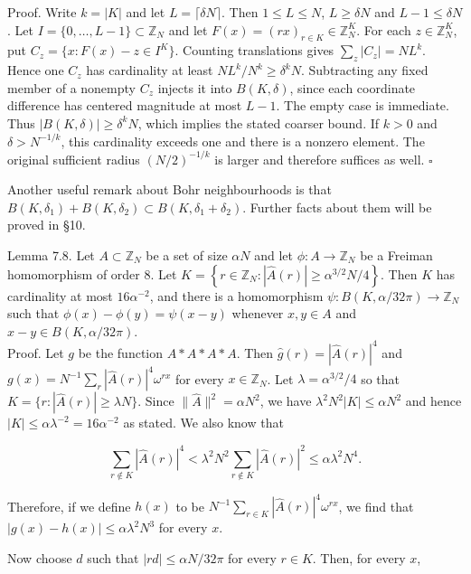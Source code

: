 \documentclass[10pt]{article}
\begin{document}
Proof. Write $k=|K|$ and let $L=\lceil\delta N\rceil$. Then
$1\leqslant L\leqslant N$, $L\geqslant\delta N$ and $L-1\leqslant\delta N$.
Let $I=\{0,\ldots,L-1\}\subset\mathbb Z_N$ and let
$F(x)=(rx)_{r\in K}\in\mathbb Z_N^K$. For each $z\in\mathbb Z_N^K$, put
$C_z=\{x:F(x)-z\in I^K\}$. Counting translations gives
$\sum_z|C_z|=NL^k$. Hence one $C_z$ has cardinality at least
$NL^k/N^k\geqslant\delta^kN$. Subtracting any fixed member of a nonempty
$C_z$ injects it into $B(K,\delta)$, since each coordinate difference has
centered magnitude at most $L-1$. The empty case is immediate. Thus
$|B(K,\delta)|\geqslant\delta^kN$, which implies the stated coarser bound.
If $k>0$ and $\delta>N^{-1/k}$, this cardinality exceeds one and there
is a nonzero element. The original sufficient radius
$(N/2)^{-1/k}$ is larger and therefore suffices as well. \(\square\)

Another useful remark about Bohr neighbourhoods is that $B\left(K, \delta_{1}\right)+B\left(K, \delta_{2}\right) \subset B\left(K, \delta_{1}+\delta_{2}\right)$. Further facts about them will be proved in §10.

Lemma 7.8. Let $A \subset \mathbb{Z}_{N}$ be a set of size $\alpha N$ and let $\phi: A \rightarrow \mathbb{Z}_{N}$ be a Freiman homomorphism of order 8. Let $K=\left\{r \in \mathbb{Z}_{N}:|\hat{A}(r)| \geqslant \alpha^{3 / 2} N / 4\right\}$. Then $K$ has cardinality at most $16 \alpha^{-2}$, and there is a homomorphism $\psi: B(K, \alpha / 32 \pi) \rightarrow \mathbb{Z}_{N}$ such that $\phi(x)-\phi(y)=\psi(x-y)$ whenever $x, y \in A$ and $x-y \in B(K, \alpha / 32 \pi)$.\\
Proof. Let $g$ be the function $A * A * A * A$. Then $\hat{g}(r)=|\hat{A}(r)|^{4}$ and $g(x)=N^{-1} \sum_{r}|\hat{A}(r)|^{4} \omega^{r x}$ for every $x \in \mathbb{Z}_{N}$. Let $\lambda=\alpha^{3 / 2} / 4$ so that\\
$K=\{r:|\hat{A}(r)| \geqslant \lambda N\}$. Since $\|\hat{A}\|^{2}=\alpha N^{2}$, we have $\lambda^{2} N^{2}|K| \leqslant \alpha N^{2}$ and hence $|K| \leqslant \alpha \lambda^{-2}=16 \alpha^{-2}$ as stated. We also know that

$$
\sum_{r \notin K}|\hat{A}(r)|^{4}<\lambda^{2} N^{2} \sum_{r \notin K}|\hat{A}(r)|^{2} \leqslant \alpha \lambda^{2} N^{4} .
$$

Therefore, if we define $h(x)$ to be $N^{-1} \sum_{r \in K}|\hat{A}(r)|^{4} \omega^{r x}$, we find that $|g(x)-h(x)| \leqslant \alpha \lambda^{2} N^{3}$ for every $x$.

Now choose $d$ such that $|r d| \leqslant \alpha N / 32 \pi$ for every $r \in K$. Then, for every $x$,
\end{document}

